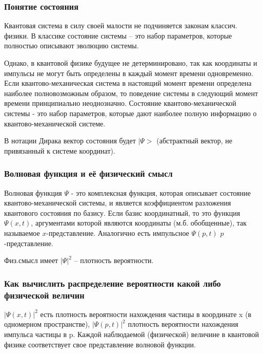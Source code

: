 
\subsubsection{Понятие состояния}\hypertarget{section}{}\label{section}

Квантовая система в силу своей малости не подчиняется законам классич. физики. В классике состояние системы -- это набор параметров, которые полностью описывают эволюцию системы.

Однако, в квантовой физике будущее не детерминировано, так как координаты и импульсы не могут быть определены в каждый момент времени одновременно. Если квантово-механическая система в настоящий момент времени определена наиболее полновозможным образом, то поведение системы в следующий момент времени принципиально неоднозначно. Состояние квантово-механической системы - это набор параметров, которые дают наиболее полную информацию о квантово-механической системе. 

В нотации Дирака вектор состояния будет $|\Psi>$ (абстрактный вектор, не привязанный к системе координат). 


\subsubsection{Волновая функция и её физический смысл}\hypertarget{section-1}{}\label{section-1}

Волновая функция $\Psi$ - это комплексная функция, которая описывает состояние квантово-механической системы, и является коэффициентом разложения квантового состояния по базису. Если базис координатный, то это функция $\Psi(x,t)$, аргументами которой являются координаты (м.б. обобщенные), так называемое \guillemotleft{}$x$-представление\guillemotright{}. Аналогично есть импульсное $\Psi(p,t)$ $p$-представление. 

Физ.смысл имеет $|\Psi|^2$ -- плотность вероятности. 


\subsubsection{Как вычислить распределение вероятности какой либо физической величин}\hypertarget{section-2}{}\label{section-2}

$|\Psi(x,t)|^2$ есть плотность вероятности нахождения частицы в координате x (в одномерном пространстве), $|\Psi(p,t)|^2$  плотность вероятности нахождения импульса частицы в p. Каждой наблюдаемой (физической) величине в квантовой физике соответствует свое представление волновой функции. 

